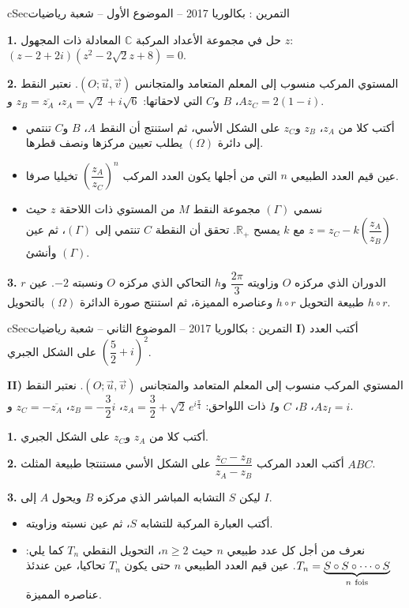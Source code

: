 \documentclass[12pt,a4paper]{article}
\newenvironment{BOX}[2]{\begin{otherlanguage}{english}\begin{arbox}{#1}{#2}}{\end{arbox}\end{otherlanguage}}
\newcounter{exo}
\newenvironment{tamrin}[1]{\stepcounter{exo}\begin{BOX}{cSec}{التمرين \theexo: #1}}{\end{BOX}}
\renewcommand{\cdots}{\mathinner{\cdotp\cdotp\cdotp}}
\newenvironment{sq}{\begin{itemize}[leftmargin=2.4em,itemsep=3pt]}{\end{itemize}}
\newcommand{\qa}{\item[(أ)]}\newcommand{\qb}{\item[(ب)]}\newcommand{\qc}{\item[(جـ)]}\newcommand{\qd}{\item[(د)]}\newcommand{\qe}{\item[(هـ)]}
\newcommand{\QQ}[1]{\par\smallskip\textbf{#1.} }
\begin{document}
\begin{tamrin}{بكالوريا 2017 -- الموضوع الأول -- شعبة رياضيات}
\QQ{1} حل في مجموعة الأعداد المركبة $\mathbb{C}$ المعادلة ذات المجهول $z$: $\left(z-2+2i\right)\left(z^2-2\sqrt2z+8\right)=0$.

\QQ{2} المستوي المركب منسوب إلى المعلم المتعامد والمتجانس $\left(O;\vec u,\vec v\right)$.
نعتبر النقط $A$، $B$ و$C$ التي لاحقاتها: $z_A=\sqrt2+i\sqrt6$، $z_B=\overline{z_A}$ و$z_C=2(1-i)$.
\begin{sq}
\qa أكتب كلا من $z_A$، $z_B$ و$z_C$ على الشكل الأسي، ثم استنتج أن النقط $A$، $B$ و$C$ تنتمي إلى دائرة $(\Omega)$ يطلب تعيين مركزها ونصف قطرها.
\qb عين قيم العدد الطبيعي $n$ التي من أجلها يكون العدد المركب $\left(\dfrac{z_A}{z_C}\right)^n$ تخيليا صرفا.
\qc نسمي $(\Gamma)$ مجموعة النقط $M$ من المستوي ذات اللاحقة $z$ حيث $z=z_C-k\left(\dfrac{z_A}{z_B}\right)$ مع $k$ يمسح $\mathbb{R}_+$.
تحقق أن النقطة $C$ تنتمي إلى $(\Gamma)$، ثم عين وأنشئ $(\Gamma)$.
\end{sq}
\QQ{3} $r$ الدوران الذي مركزه $O$ وزاويته $\dfrac{2\pi}{3}$ و$h$ التحاكي الذي مركزه $O$ ونسبته $-2$.
عين طبيعة التحويل $h\circ r$ وعناصره المميزة، ثم استنتج صورة الدائرة $(\Omega)$ بالتحويل $h\circ r$.
\end{tamrin}

\begin{tamrin}{بكالوريا 2017 -- الموضوع الثاني -- شعبة رياضيات}
\textbf{I)} أكتب العدد $\left(\dfrac52+i\right)^2$ على الشكل الجبري.

\textbf{II)} المستوي المركب منسوب إلى المعلم المتعامد والمتجانس $\left(O;\vec u,\vec v\right)$.
نعتبر النقط $A$، $B$، $C$ و$I$ ذات اللواحق: $z_A=\dfrac32+\sqrt2\,e^{i\frac{\pi}{4}}$، $z_B=-\dfrac32i$، $z_C=-\overline{z_A}$ و$z_I=i$.

\QQ{1} أكتب كلا من $z_A$ و$z_C$ على الشكل الجبري.

\QQ{2} أكتب العدد المركب $\dfrac{z_C-z_B}{z_A-z_B}$ على الشكل الأسي مستنتجا طبيعة المثلث $ABC$.

\QQ{3} ليكن $S$ التشابه المباشر الذي مركزه $B$ ويحول $A$ إلى $I$.
\begin{sq}
\qa أكتب العبارة المركبة للتشابه $S$، ثم عين نسبته وزاويته.
\qb نعرف من أجل كل عدد طبيعي $n$ حيث $n\geq2$، التحويل النقطي $T_n$ كما يلي: $T_n=\underbrace{S\circ S\circ\cdots\circ S}_{n\ \text{fois}}$.
عين قيم العدد الطبيعي $n$ حتى يكون $T_n$ تحاكيا، عين عندئذ عناصره المميزة.
\end{sq}
\end{tamrin}
\end{document}
